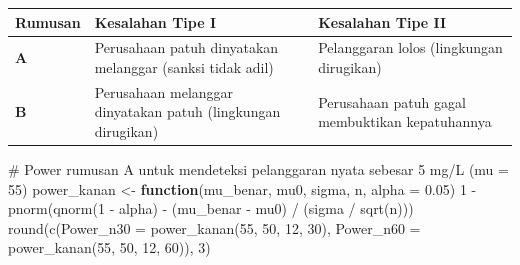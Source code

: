 \documentclass[
  indonesian,
  letterpaper,
]{book}
\newenvironment{Shaded}{\begin{snugshade}}{\end{snugshade}}
\newcommand{\AttributeTok}[1]{\textcolor[rgb]{0.40,0.45,0.13}{#1}}
\newcommand{\CommentTok}[1]{\textcolor[rgb]{0.37,0.37,0.37}{#1}}
\newcommand{\ControlFlowTok}[1]{\textcolor[rgb]{0.00,0.23,0.31}{\textbf{#1}}}
\newcommand{\DecValTok}[1]{\textcolor[rgb]{0.68,0.00,0.00}{#1}}
\newcommand{\FloatTok}[1]{\textcolor[rgb]{0.68,0.00,0.00}{#1}}
\newcommand{\FunctionTok}[1]{\textcolor[rgb]{0.28,0.35,0.67}{#1}}
\newcommand{\NormalTok}[1]{\textcolor[rgb]{0.00,0.23,0.31}{#1}}
\newcommand{\OtherTok}[1]{\textcolor[rgb]{0.00,0.23,0.31}{#1}}
\newcommand{\SpecialCharTok}[1]{\textcolor[rgb]{0.37,0.37,0.37}{#1}}
\newcounter{none} %
\begin{document}
{\def\LTcaptype{none} %
\begin{longtable}[]{@{}
  >{\raggedright\arraybackslash}p{}
  >{\raggedright\arraybackslash}p{}
  >{\raggedright\arraybackslash}p{}@{}}
\toprule\noalign{}
\begin{minipage}[b]{\linewidth}\raggedright
Rumusan
\end{minipage} & \begin{minipage}[b]{\linewidth}\raggedright
Kesalahan Tipe I
\end{minipage} & \begin{minipage}[b]{\linewidth}\raggedright
Kesalahan Tipe II
\end{minipage} \\
\midrule\noalign{}
\endhead
\bottomrule\noalign{}
\endlastfoot
\textbf{A} & Perusahaan patuh dinyatakan melanggar (sanksi tidak adil) &
Pelanggaran lolos (lingkungan dirugikan) \\
\textbf{B} & Perusahaan melanggar dinyatakan patuh (lingkungan
dirugikan) & Perusahaan patuh gagal membuktikan kepatuhannya \\
\end{longtable}
}

\begin{Shaded}
\begin{Highlighting}[]
\CommentTok{\# Power rumusan A untuk mendeteksi pelanggaran nyata sebesar 5 mg/L (mu = 55)}
\NormalTok{power\_kanan }\OtherTok{\textless{}{-}} \ControlFlowTok{function}\NormalTok{(mu\_benar, mu0, sigma, n, }\AttributeTok{alpha =} \FloatTok{0.05}\NormalTok{)}
  \DecValTok{1} \SpecialCharTok{{-}} \FunctionTok{pnorm}\NormalTok{(}\FunctionTok{qnorm}\NormalTok{(}\DecValTok{1} \SpecialCharTok{{-}}\NormalTok{ alpha) }\SpecialCharTok{{-}}\NormalTok{ (mu\_benar }\SpecialCharTok{{-}}\NormalTok{ mu0) }\SpecialCharTok{/}\NormalTok{ (sigma }\SpecialCharTok{/} \FunctionTok{sqrt}\NormalTok{(n)))}
\FunctionTok{round}\NormalTok{(}\FunctionTok{c}\NormalTok{(}\AttributeTok{Power\_n30 =} \FunctionTok{power\_kanan}\NormalTok{(}\DecValTok{55}\NormalTok{, }\DecValTok{50}\NormalTok{, }\DecValTok{12}\NormalTok{, }\DecValTok{30}\NormalTok{), }\AttributeTok{Power\_n60 =} \FunctionTok{power\_kanan}\NormalTok{(}\DecValTok{55}\NormalTok{, }\DecValTok{50}\NormalTok{, }\DecValTok{12}\NormalTok{, }\DecValTok{60}\NormalTok{)), }\DecValTok{3}\NormalTok{)}
\end{Highlighting}
\end{Shaded}
\end{document}

